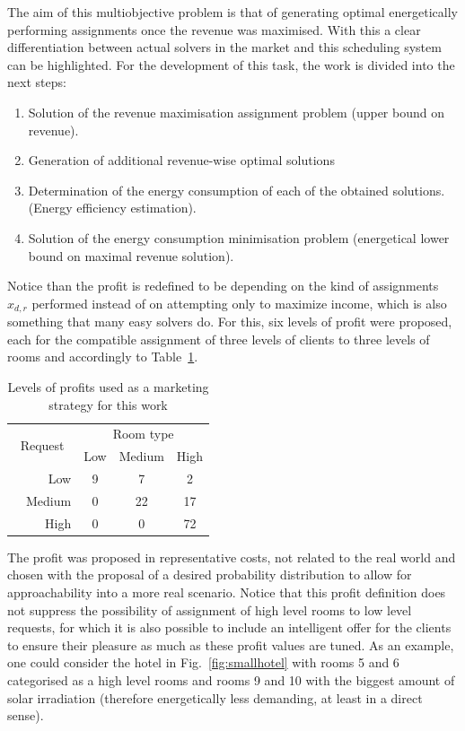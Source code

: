  The aim of this multiobjective problem is that of generating optimal energetically performing assignments once the revenue was maximised. With this a clear differentiation between actual solvers in the market and this scheduling system can be highlighted. For the development of this task, the work is divided into the next steps:
 \begin{enumerate}
 	\item Solution of the revenue maximisation assignment problem (upper bound on revenue).
 	\item Generation of additional revenue-wise optimal solutions 
 	\item Determination of the energy consumption of each of the obtained solutions. (Energy efficiency estimation).
 	\item Solution of the energy consumption minimisation problem (energetical lower bound on maximal revenue solution).
 \end{enumerate}
 
 Notice than the profit is redefined to be depending on the kind of assignments $x_{d,r}$ performed instead of on attempting only to maximize income, which is also something that many easy solvers do. For this, six levels of profit were proposed, each for the compatible assignment of three levels of clients to three levels of rooms and accordingly to Table~\ref{tab:profits}.
 \begin{table}[htbp]
 	\centering
 	\caption{Levels of profits used as a marketing strategy for this work}
 	\begin{tabular}{cr|ccc}
 		\toprule
 		\multicolumn{2}{c|}{\multirow{2}[0]{*}{Request}} & \multicolumn{3}{c}{Room type} \\
 		\multicolumn{2}{c|}{} & Low  & Medium & High \\ 
 		\midrule
 		\multirow{2}[0]{*}{} & Low &   9   &   7    & 2 \\
 		& Medium &   0    &   22    &  17\\
 		& High &0 & 0& 72\\
 		\bottomrule
 	\end{tabular}%
 	\label{tab:profits}%
 \end{table}%
 
 The profit was proposed in representative costs, not related to the real world and chosen with the proposal of a desired probability distribution to allow for approachability into a more real scenario. Notice that this profit definition does not suppress the possibility of assignment of high level rooms to low level requests, for which it is also possible to include an intelligent offer for the clients to ensure their pleasure as much as these profit values are tuned. As an example, one could consider the hotel in Fig.~\ref{fig:smallhotel} with rooms 5 and 6 categorised as a high level rooms and rooms 9 and 10 with the biggest amount of solar irradiation (therefore energetically less demanding, at least in a direct sense).
 
